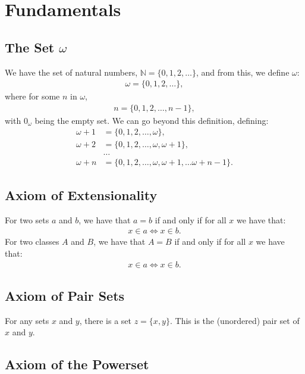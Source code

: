 \section{Fundamentals}

\subsection{The Set $\omega$}

We have the set of natural numbers, $\mathbb{N} = \{0, 1, 2, \ldots\}$,
and from this, we define $\omega$: \begin{align*}
    \omega = \{0, 1, 2, \ldots\},
\end{align*} where for some $n$ in $\omega$, \begin{align*}
    n = \{0, 1, 2, \ldots, n - 1\},
\end{align*} with $0_\omega$ being the empty set. We can go beyond this
definition, defining: \begin{align*}
    \omega + 1 &= \{0, 1, 2, \ldots, \omega\}, \\
    \omega + 2 &= \{0, 1, 2, \ldots, \omega, \omega + 1\}, \\
    &\ldots \\
    \omega + n &= \{0, 1, 2, \ldots, \omega, \omega + 1, \ldots \omega + n - 1\}.
\end{align*}

\subsection{Axiom of Extensionality}

For two sets $a$ and $b$, we have that $a = b$ if and only if for all
$x$ we have that: \begin{align*}
    x \in a \Longleftrightarrow x \in b.
\end{align*} 
For two classes $A$ and $B$, we have that $A = B$ if and only if for all
$x$ we have that: \begin{align*}
    x \in a \Longleftrightarrow x \in b.
\end{align*}

\subsection{Axiom of Pair Sets}

For any sets $x$ and $y$, there is a set $z = \{x, y\}$. This is the
(unordered) pair set of $x$ and $y$.

\subsection{Axiom of the Powerset}

